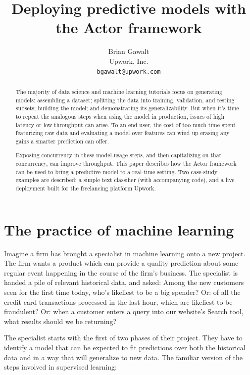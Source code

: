\documentclass{article}
\begin{document}
\title{Deploying predictive models with the Actor framework}
\author{Brian Gawalt \\
Upwork, Inc. \\
\texttt{bgawalt@upwork.com}
}

\maketitle


\begin{abstract}
The majority of data science and machine learning tutorials focus on generating models: assembling a dataset; splitting the data into training, validation, and testing subsets; building the model; and demonstrating its generalizability. But when it's time to repeat the analogous steps when using the model in production, issues of high latency or low throughput can arise. To an end user, the cost of too much time spent featurizing raw data and evaluating a model over features can wind up erasing any gains a smarter prediction can offer. 

Exposing concurrency in these model-usage steps, and then capitalizing on that concurrency, can improve throughput. This paper describes how the Actor framework can be used to bring a predictive model to a real-time setting. Two case-study examples are described: a simple text classifier (with accompanying code), and a live deployment built for the freelancing platform Upwork.
\end{abstract}

\section{The practice of machine learning}

Imagine a firm has brought a specialist in machine learning onto a new project. The firm wants a product which can provide a quality prediction about some regular event happening in the course of the firm's business. The specialist is handed a pile of relevant historical data, and asked: Among the new customers seen for the first time today, who's likeliest to be a big spender? Or: of all the credit card transactions processed in the last hour, which are likeliest to be fraudulent? Or: when a customer enters a query into our website's Search tool, what results should we be returning?

The specialist starts with the first of two phases of their project. They have to identify a model that can be expected to fit predictions over both the historical data and in a way that will generalize to new data. The familiar version of the steps involved in supervised learning: 
\end{document}
